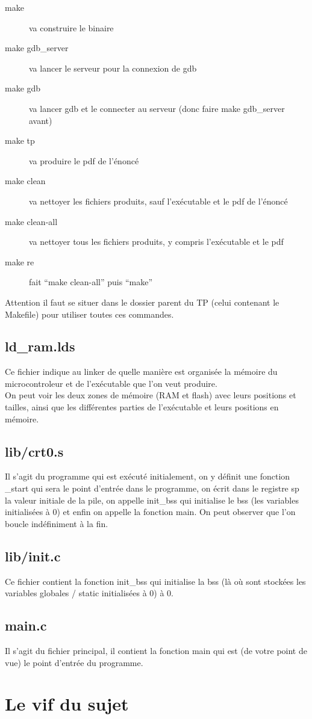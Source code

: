 \documentclass[a4paper,10pt]{article} %
\begin{document}
\begin{description}
    \item[make] va construire le binaire
    \item[make gdb\_server] va lancer le serveur pour la connexion de gdb
    \item[make gdb] va lancer gdb et le connecter au serveur (donc faire make gdb\_server avant)
    \item[make tp] va produire le pdf de l'énoncé
    \item[make clean] va nettoyer les fichiers produits, sauf l’exécutable et le pdf de l'énoncé
    \item[make clean-all] va nettoyer tous les fichiers produits, y compris l’exécutable et le pdf
    \item[make re] fait ``make clean-all'' puis ``make''
\end{description}

Attention il faut se situer dans le dossier parent du TP (celui contenant le Makefile) pour utiliser toutes ces commandes.

\subsection{ld\_ram.lds}
Ce fichier indique au linker de quelle manière est organisée la mémoire du microcontroleur et de l’exécutable que l'on veut produire.\\

On peut voir les deux zones de mémoire (RAM et flash) avec leurs positions et tailles, ainsi que les différentes parties de l’exécutable et leurs positions en mémoire.

\subsection{lib/crt0.s}
Il s'agit du programme qui est exécuté initialement, on y définit une fonction \_start qui sera le point d'entrée dans le programme, on écrit dans le registre sp la valeur initiale de la pile, on appelle init\_bss qui initialise le bss (les variables initialisées à 0) et enfin on appelle la fonction main. On peut observer que l'on boucle indéfiniment à la fin.

\subsection{lib/init.c}
Ce fichier contient la fonction init\_bss qui initialise la bss (là où sont stockées les variables globales / static initialisées à 0) à 0.

\subsection{main.c}
Il s'agit du fichier principal, il contient la fonction main qui est (de votre point de vue) le point d'entrée du programme.

\section{Le vif du sujet}
\end{document}
